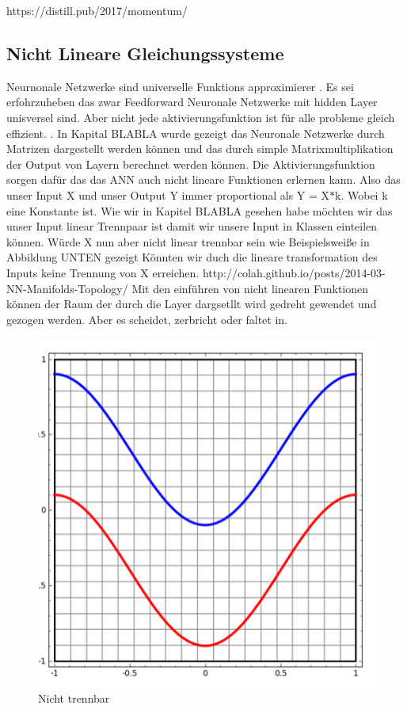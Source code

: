 \documentclass{llncs}
\begin{document}
https://distill.pub/2017/momentum/
\subsection{Nicht Lineare Gleichungssysteme}
Neurnonale Netzwerke sind universelle Funktions approximierer \cite{universal}. Es sei erfohrzuheben das zwar Feedforward Neuronale Netzwerke mit hidden Layer unisversel sind. Aber nicht jede aktivierungsfunktion ist für alle probleme gleich effizient. \cite{universal}.
In Kapital BLABLA wurde gezeigt das Neuronale Netzwerke durch Matrizen dargestellt werden können und das durch simple Matrixmultiplikation der Output von Layern berechnet werden können. Die Aktivierungsfunktion sorgen dafür das das ANN auch nicht lineare Funktionen erlernen kann. Also das unser Input X und unser Output Y immer proportional als Y = X$*$k. Wobei k eine Konstante ist.  Wie wir in Kapitel BLABLA gesehen habe möchten wir das unser Input linear Trennpaar ist damit wir unsere Input in Klassen einteilen können. Würde X nun aber nicht linear trennbar sein wie Beispielsweiße in Abbildung UNTEN gezeigt Könnten wir duch die lineare transformation des Inputs keine Trennung von X erreichen. http://colah.github.io/posts/2014-03-NN-Manifolds-Topology/ Mit den einführen von nicht linearen Funktionen können der Raum der durch die Layer dargsetllt wird gedreht gewendet und gezogen werden. Aber es scheidet, zerbricht oder faltet in. 


\begin{figure}[htbp] 
	\centering
	\includegraphics[width=1.0\textwidth]{lineartrennbar.png}
	\caption{Nicht trennbar}
	\label{fig:Bild1}
\end{figure}
\end{document}
